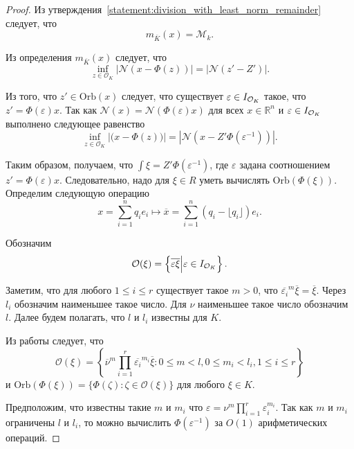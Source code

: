 \documentclass[_00_dissertation.tex]{subfiles}
\begin{document}
\begin{proof}
    Из утверждения~\ref{statement:division_with_least_norm_remainder} следует, что
    \begin{equation*}
        m_{\overline{K}}(x) = \mathcal{M}_k.
    \end{equation*}
    
    Из определения $m_{\overline{K}}(x)$ следует, что
    \begin{equation*}
        \inf\limits_{z \in \mathcal{O}_K} |\mathcal{N}(x - \Phi(z))| = |\mathcal{N}(z' - Z')|.
    \end{equation*}

    Из того, что $z' \in \textrm{Orb}(x)$ следует, что существует $\varepsilon \in I_{\mathcal{O}_K}$ такое, что $z' = \Phi(\varepsilon)x$.
    Так как $\mathcal{N}(x) = \mathcal{N}(\Phi(\varepsilon)x)$ для всех $x \in \mathbb{R}^n$ и $\varepsilon \in I_{\mathcal{O}_K}$ выполнено следующее равенство
    \begin{equation*}
        \inf\limits_{z \in \mathcal{O}_K} |\mathcal(x - \Phi(z))| = |\mathcal{N}(x - Z'\Phi(\varepsilon^{-1}))|.
    \end{equation*}

    Таким образом, получаем, что $\int{\xi} = Z'\Phi(\varepsilon^{-1})$, где $\varepsilon$ задана соотношением $z' = \Phi(\varepsilon)x$.
    Следовательно, надо для $\xi \in R$ уметь вычислять $\textrm{Orb}(\Phi(\xi))$.
    Определим следующую операцию
    \begin{equation*}
        x = \sum\limits_{i=1}^n q_i e_i \longmapsto \overline{x} = \sum\limits_{i=1}^n (q_i - \lfloor q_i \rfloor)e_i.
    \end{equation*}
    
    Обозначим
    \begin{equation*}
        \mathcal{O}(\xi) = \left\{
            \overline{\varepsilon\xi} \Big| \varepsilon \in I_{\mathcal{O}_K}
    	\right\}.
    \end{equation*}
    
    Заметим, что для любого $1 \le i \le r$ существует такое $m > 0$, что $\overline{\varepsilon_i}^m\overline{\xi} = \overline{\xi}$.
    Через $l_i$ обозначим наименьшее такое число.
    Для $\nu$ наименьшее такое число обозначим $l$.
    Далее будем полагать, что $l$ и $l_i$ известны для $K$.
    
    Из работы \cite[с.~1413]{source:Lezowski} следует, что
    \begin{equation*}
        \mathcal{O}(\xi) = \left\{
            \overline{\nu}^m \prod\limits_{i=1}^r \overline{\varepsilon_i}^{m_i} \overline{\xi}:
                0 \le m < l, 0 \le m_i < l_i, 1 \le i \le r
        \right\}
    \end{equation*}
    и $\textrm{Orb}(\Phi(\xi)) = \{\Phi(\zeta):\zeta \in \mathcal{O}(\xi)\}$ для любого $\xi\in K$.

    Предположим, что известны такие $m$ и $m_i$ что $\varepsilon = \nu^m\prod_{i=1}^r \varepsilon_i^{m_i}$.
    Так как $m$ и $m_i$ ограничены $l$ и $l_i$, то можно вычислить $\Phi(\varepsilon^{-1})$ за $O(1)$ арифметических операций.
\end{proof}
\end{document}
